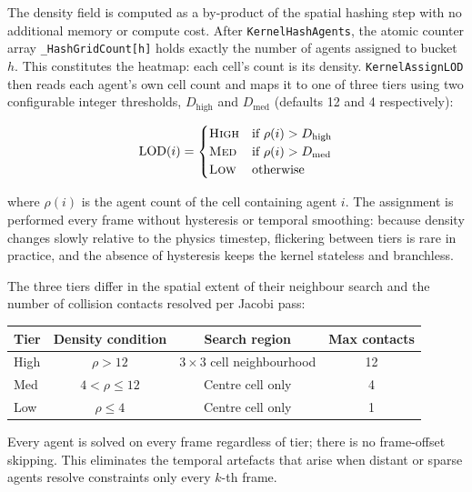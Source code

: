 The density field is computed as a by-product of the spatial hashing step with
no additional memory or compute cost.  After \texttt{KernelHashAgents}, the
atomic counter array \texttt{\_HashGridCount[h]} holds exactly the number of
agents assigned to bucket $h$.  This constitutes the heatmap: each cell's
count is its density.  \texttt{KernelAssignLOD} then reads each agent's own
cell count and maps it to one of three tiers using two configurable integer
thresholds, $D_{\mathrm{high}}$ and $D_{\mathrm{med}}$ (defaults 12 and 4
respectively):

\begin{equation}
    \mathrm{LOD}(i) =
    \begin{cases}
        \text{\textsc{High}} & \text{if } \rho(i) > D_{\mathrm{high}} \\
        \text{\textsc{Med}}  & \text{if } \rho(i) > D_{\mathrm{med}}  \\
        \text{\textsc{Low}}  & \text{otherwise}
    \end{cases}
\end{equation}

where $\rho(i)$ is the agent count of the cell containing agent $i$.  The
assignment is performed every frame without hysteresis or temporal smoothing:
because density changes slowly relative to the physics timestep, flickering
between tiers is rare in practice, and the absence of hysteresis keeps the
kernel stateless and branchless.

The three tiers differ in the spatial extent of their neighbour search and the
number of collision contacts resolved per Jacobi pass:

\begin{center}
\begin{tabular}{lccc}
\hline
\textbf{Tier} & \textbf{Density condition} & \textbf{Search region} & \textbf{Max contacts} \\
\hline
High & $\rho > 12$ & $3\times3$ cell neighbourhood & 12 \\
Med  & $4 < \rho \leq 12$ & Centre cell only & 4 \\
Low  & $\rho \leq 4$ & Centre cell only & 1 \\
\hline
\end{tabular}
\end{center}

Every agent is solved on every frame regardless of tier; there is no
frame-offset skipping.  This eliminates the temporal artefacts that arise when
distant or sparse agents resolve constraints only every $k$-th frame.

